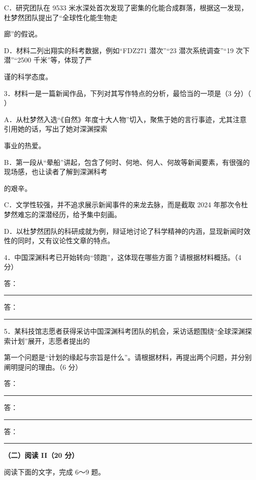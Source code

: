 \documentclass[UTF8,a4paper,fontset=fandol]{ctexart}
\begin{document}
C．研究团队在 9533 米水深处首次发现了密集的化能合成群落，根据这一发现，杜梦然团队提出了“全球性化能生物走\par
\hspace*{1.8em}廊”的假说。\par
D．材料二列出翔实的科考数据，例如“FDZ271 潜次”“23 潜次系统调查”“19 次下潜”“2500 千米”等，体现了严\par
谨的科学态度。\par
\vspace{0.35em}\par
3．材料一是一篇新闻作品，下列对其写作特点的分析，最恰当的一项是（3 分）（ ）\par
A．从杜梦然入选“《自然》年度十大人物”切入，聚焦于她的言行事迹，尤其注意引用她的话，写出了她对深渊探索\par
\hspace*{1.8em}事业的热爱。\par
B．第一段从“晕船”讲起，包含了何时、何地、何人、何故等新闻要素，有很强的现场感，也让读者了解到深渊科考\par
\hspace*{1.8em}的艰辛。\par
C．文学性较强，并不追求展示新闻事件的来龙去脉，而是截取 2024 年那次令杜梦然难忘的深潜经历，给予集中刻画。\par
D．以杜梦然团队的科研成就为例，辩证地讨论了科学精神的内涵，显现新闻时效性的同时，又有议论性文章的特点。\par
\vspace{0.35em}\par
4．中国深渊科考已开始转向“领跑”，这体现在哪些方面？请根据材料概括。（4 分）\par
\noindent 答：\rule{0.88\linewidth}{0.35pt}\par
\noindent 答：\rule{0.88\linewidth}{0.35pt}\par
5．某科技馆志愿者获得采访中国深渊科考团队的机会，采访话题围绕“全球深渊探索计划”展开，志愿者提出的\par
第一个问题是“计划的缘起与宗旨是什么”。请根据材料，再提出两个问题，并分别阐明提问的理由。（6 分）\par
\noindent 答：\rule{0.88\linewidth}{0.35pt}\par
\noindent 答：\rule{0.88\linewidth}{0.35pt}\par
\noindent 答：\rule{0.88\linewidth}{0.35pt}\par
\clearpage
\vspace{0.25em}\textbf{（二）阅读 II（20 分）}\par
阅读下面的文字，完成 6～9 题。\par
\end{document}
